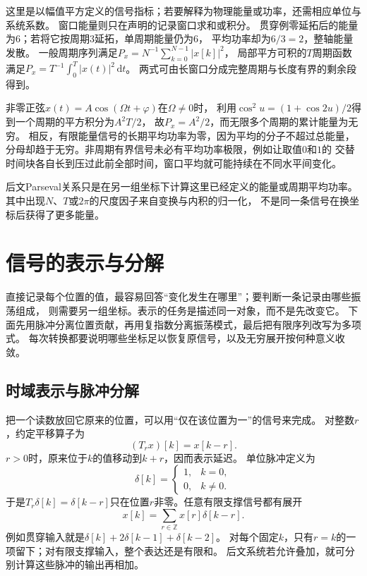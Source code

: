 这里是以幅值平方定义的信号指标；若要解释为物理能量或功率，还需相应单位与系统系数。
窗口能量则只在声明的记录窗口求和或积分。
贯穿例零延拓后的能量为$6$；若将它按周期$3$延拓，单周期能量仍为$6$，
平均功率却为$6/3=2$，整轴能量发散。
一般周期序列满足$P_x=N^{-1}\sum_{k=0}^{N-1}|x[k]|^2$，
局部平方可积的$T$周期函数满足$P_x=T^{-1}\int_0^T|x(t)|^2\,\mathrm dt$。
两式可由长窗口分成完整周期与长度有界的剩余段得到。

非零正弦$x(t)=A\cos(\Omega t+\varphi)$在$\Omega\neq0$时，
利用$\cos^2 u=(1+\cos2u)/2$得到一个周期的平方积分为$A^2T/2$，
故$P_x=A^2/2$，而无限多个周期的累计能量为无穷。
相反，有限能量信号的长期平均功率为零，因为平均的分子不超过总能量，
分母却趋于无穷。非周期有界信号未必有平均功率极限，例如让取值$0$和$1$的
交替时间块各自长到压过此前全部时间，窗口平均就可能持续在不同水平间变化。

后文Parseval关系只是在另一组坐标下计算这里已经定义的能量或周期平均功率。
其中出现$N$、$T$或$2\pi$的尺度因子来自变换与内积的归一化，
不是同一条信号在换坐标后获得了更多能量。

\section{信号的表示与分解}
\label{sec:signal-analysis-frequency-representation}

直接记录每个位置的值，最容易回答“变化发生在哪里”；要判断一条记录由哪些振荡组成，
则需要另一组坐标。表示的任务是描述同一对象，而不是先改变它。
下面先用脉冲分离位置贡献，再用复指数分离振荡模式，最后把有限序列改写为多项式。
每次转换都要说明哪些坐标足以恢复原信号，以及无穷展开按何种意义收敛。

\subsection{时域表示与脉冲分解}
\label{sec:signal-time-impulses}

把一个读数放回它原来的位置，可以用“仅在该位置为一”的信号来完成。
对整数$r$，约定平移算子为
\[
  (T_rx)[k]=x[k-r].
\]
$r>0$时，原来位于$k$的值移动到$k+r$，因而表示延迟。
单位脉冲定义为
\[
  \delta[k]=
  \begin{cases}
    1,&k=0,\\
    0,&k\neq0.
  \end{cases}
\]
于是$T_r\delta[k]=\delta[k-r]$只在位置$r$非零。任意有限支撑信号都有展开
\begin{equation}
  x[k]=\sum_{r\in\mathbb Z}x[r]\delta[k-r].
  \label{eq:signal-analysis-impulse-expansion}
\end{equation}
例如贯穿输入就是$\delta[k]+2\delta[k-1]+\delta[k-2]$。
对每个固定$k$，只有$r=k$的一项留下；对有限支撑输入，整个表达还是有限和。
后文系统若允许叠加，就可分别计算这些脉冲的输出再相加。


